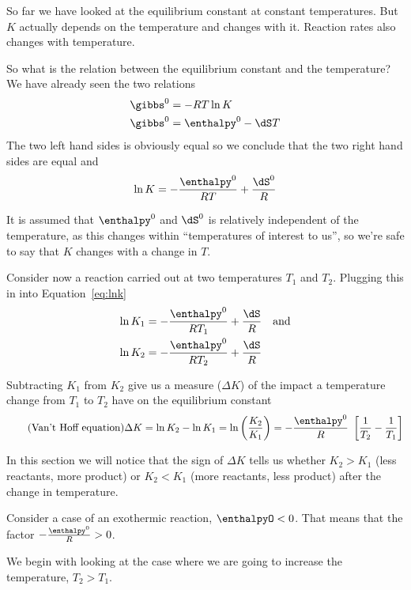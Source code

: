 \documentclass[../mit-general-chemistry.tex]{subfiles}
\begin{document}
So far we have looked at the equilibrium constant at constant
temperatures. But $K$ actually depends on the temperature and changes
with it. Reaction rates also changes with temperature.

So what is the relation between the equilibrium constant and the
temperature? We have already seen the two relations
\begin{align*}
  \gibbs^0 &= -RT \ln K \\
  \gibbs^0 &= \enthalpy^0 - \dS T \\
\end{align*}
The two left hand sides is obviously equal so we conclude that the two
right hand sides are equal and
\begin{equation}\label{eq:lnk}
  \ln K = - \frac{\enthalpy^0}{RT} + \frac{\dS^0}{R}
\end{equation}

It is assumed that $\enthalpy^0$ and $\dS^0$ is relatively independent
of the temperature, as this changes within ``temperatures of interest
to us'', so we're safe to say that $K$ changes with a change in $T$.


Consider now a reaction carried out at two temperatures $T_1$ and
$T_2$. Plugging this in into Equation~\ref{eq:lnk}
\begin{align*}
  \ln K_1 &= -\frac{\enthalpy^0}{RT_1} + \frac{\dS}{R}\quad\text{and}\\
  \ln K_2 &= -\frac{\enthalpy^0}{RT_2} + \frac{\dS}{R}\\
\end{align*}

Subtracting $K_1$ from $K_2$ give us a measure ($\Delta K$) of the
impact a temperature change from $T_1$ to $T_2$ have on the
equilibrium constant
\begin{equation}\label{eq:van't hoff}\tag{Van't Hoff equation}
  \Delta K = \ln K_2 - \ln K_1 = \ln\left(\frac{K_2}{K_1}\right) = - \frac{\enthalpy^0}{R}~\left[\frac{1}{T_2} - \frac{1}{T_1}\right]
\end{equation}

In this section we will notice that the sign of $\Delta K$ tells us
whether $K_2 > K_1$ (less reactants, more product) or $K_2 < K_1$
(more reactants, less product) after the change in temperature.


Consider a case of an exothermic reaction, $\enthalpyO < 0$. That
means that the factor $- \frac{\enthalpy^0}{R} > 0$.

We begin with looking at the case where we are going to increase the
temperature, $T_2 > T_1$.
\end{document}
